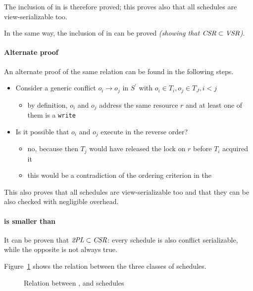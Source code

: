 \documentclass[english]{article}
\begin{document}
The inclusion of \TPL in \CSR is therefore proved;
this proves also that all \TPL schedules are view-serializable too.

In the same way, the inclusion of \TPL in \VSR can be proved \textit{(showing that \(\textit{CSR} \subset \textit{VSR}\))}.

\paragraph{Alternate proof}

An alternate proof of the same relation can be found in the following steps.

\begin{itemize}
  \item Consider a generic conflict \(o_i \rightarrow o_j\) in \(S^\prime\) with \(o_i \in T_i, o_j \in T_J, i < j\)
        \begin{itemize}
          \item by definition, \(o_i\) and \(o_j\) address the same resource \(r\) and at least one of them is a \texttt{write}
        \end{itemize}
  \item Is it possible that \(o_i\) and \(o_j\) execute in the reverse order?
        \begin{itemize}
          \item no, because then \(T_j\) would have released the lock on \(r\) before \(T_i\) acquired it
          \item this would be a contradiction of the ordering criterion in the \TPL
        \end{itemize}
\end{itemize}

\bigskip
This also proves that all \TPL schedules are view-serializable too and that they can be also checked with negligible overhead.

\paragraph{\TPL is smaller than \CSR}

It can be proven that \(\textit{2PL} \subset \textit{CSR}\): every \TPL schedule is also conflict serializable, while the opposite is not always true.

\bigskip
Figure~\ref{fig:relation-between-tpl-csr-vsr-schedules} shows the relation between the three classes of schedules.

\begin{figure}[htbp]
  \centering
  \bigskip
  \caption{Relation between \TPL, \CSR and \VSR schedules}
  \label{fig:relation-between-tpl-csr-vsr-schedules}
  \bigskip
\end{figure}
\end{document}
